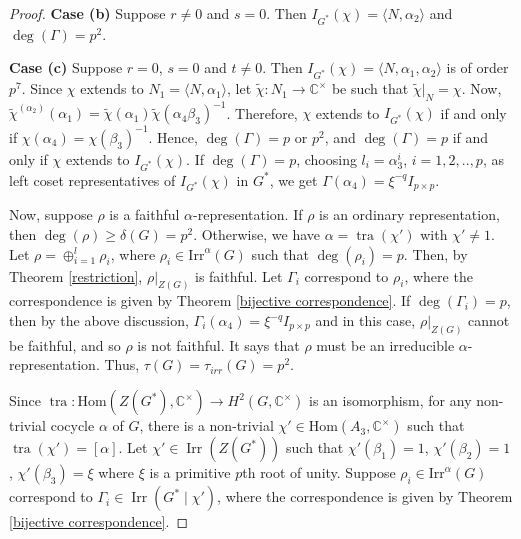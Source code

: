 \documentclass[a4paper,11pt]{amsart}
\numberwithin{equation}{section}
\numberwithin{equation}{subsection}
\newcommand{\C}{\mathbb{C}}
\newcommand{\tg}{\tau(G)}
\newcommand{\ti}{\tau_{irr}(G)}
\newcommand{\irr}{\mathrm{Irr}}
\newcommand{\Hom}{\mathrm{Hom}}
\newcommand{\tra}{\operatorname{tra}}
\begin{document}
\begin{proof}
\textbf{Case (b)} Suppose $r\neq 0$ and $s =0$. Then $I_{{G}^*}(\chi) = \langle N, \alpha_2 \rangle$ and $\deg(\Gamma)=p^2$. 

\textbf{Case (c)} Suppose $r = 0$, $s= 0$ and $t \neq 0$. Then $I_{{G}^*}(\chi) = \langle N, \alpha_1, \alpha_2 \rangle$ is of order $p^7$. Since $\chi$ extends to $N_1= \langle N, \alpha_1  \rangle$, let $\tilde{\chi}: N_1 \to \C^\times$ be such that $\tilde{\chi}|_N = \chi$. Now,  $\tilde{\chi}^{(\alpha_2)}(\alpha_1)= \tilde{\chi}(\alpha_1)\tilde{\chi}(\alpha_4 \beta_3)^{-1}$. Therefore, $\chi$ extends to $I_{{G}^*}(\chi)$ if and only if $\chi(\alpha_4)= \chi(\beta_3)^{-1}$. 
Hence, $\deg(\Gamma) =p$ or $p^2$, and $\deg(\Gamma) =p$ if and only if $\chi$ extends to $I_{{G}^*}(\chi)$.
If $\deg(\Gamma)= p$, choosing $l_i= \alpha_3^i$, $i=1,2,..,p$, as left coset representatives of $I_{{G}^*}(\chi)$ in $G^*$, we get $\Gamma(\alpha_4)= \xi^{-q} I_{p \times p}$.

Now, suppose $\rho$ is a faithful $\alpha$-representation.
If $\rho$ is an ordinary representation, then  $\deg(\rho) \geq \delta(G) =p^2$. Otherwise, we have $\alpha= \operatorname{tra}(\chi')$ with $\chi'\neq 1$.
Let $\rho =\oplus_{i=1}^l\rho_i$, where $\rho_i \in \irr^\alpha(G)$ such that $\deg(\rho_i)=p$. Then, by Theorem \ref{restriction}, $\rho|_{Z(G)}$ is faithful. Let $\Gamma_i$ correspond to $\rho_i$, where the correspondence is given by Theorem \ref{bijective correspondence}. If $\deg(\Gamma_i) = p$, then 
by the above discussion,
$\Gamma_i(\alpha_4)=\xi^{-q} I_{p \times p}$ and in this case, $\rho|_{Z(G)}$ cannot be faithful, and so $\rho$ is not faithful. It says that $\rho$ must be an irreducible $\alpha$-representation.
Thus, $\tg= \ti =p^2$.



\iffalse
Since $\tra: \Hom(Z({G}^*),\C^\times)\to H^2(G,\C^\times)$ is an isomorphism, for any non-trivial cocycle $\alpha$ of $G$, there is a non-trivial $\chi' \in \mathrm{Hom}(A_3, \C^\times)$ such that $\tra(\chi')=[\alpha]$. Let $\chi' \in \operatorname{Irr}(Z({G}^*))$ such that $\chi'(\beta_1) = 1$, $\chi'(\beta_2) = 1$, $\chi'(\beta_3)= \xi$ where $\xi$ is a primitive $p$th root of unity. Suppose $\rho_i \in \mathrm{Irr}^\alpha(G)$ correspond to $\Gamma_i \in \operatorname{Irr}({G}^* \mid \chi')$, where the correspondence is given by Theorem \ref{bijective correspondence}. 


\end{proof}
\end{document}
